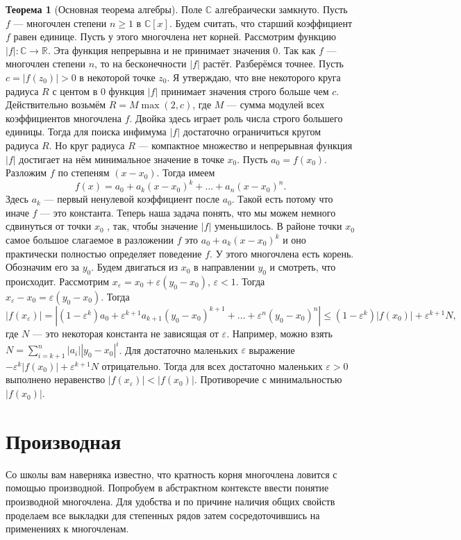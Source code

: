 \documentclass[10pt,a4paper,oneside]{book} %
\theoremstyle{definition}
\newtheorem*{thmm}{Теорема}
\newcommand{\mb}[1]{\mathbb{#1}}
\def\eps{\varepsilon}
\begin{document}
\begin{thmm}[Основная теорема алгебры] Поле $\mb C$ алгебраически замкнуто.
\proof Пусть $f$ — многочлен степени $n\geq 1$ в $\mb C[x]$. Будем считать, что старший коэффициент $f$ равен единице. Пусть у этого многочлена нет корней. Рассмотрим функцию $|f|\colon \mb C \to \mb R$. Эта функция непрерывна и не принимает значения 0. Так как $f$ --- многочлен степени $n$, то на бесконечности $|f|$ растёт. Разберёмся точнее. Пусть
$c = |f(z_0)| > 0$ в некоторой точке $z_0$. Я утверждаю, что вне некоторого круга радиуса $R$ с центом в 0 функция
$|f|$ принимает значения строго больше чем $c$. Действительно возьмём $R= M \max(2,c)$, где $M$ --- сумма модулей всех коэффициентов многочлена $f$. Двойка здесь играет роль числа строго большего единицы.
Тогда для поиска инфимума $|f|$ достаточно ограничиться кругом радиуса $R$. Но круг радиуса $R$ --- компактное множество и непрерывная функция $|f|$ достигает на нём минимальное значение в точке $x_0$. Пусть $a_0 =f(x_0)$. Разложим
$f$ по степеням $(x-x_0)$. Тогда имеем
$$f(x) = a_0 + a_k (x-x_0)^k + \dots + a_n(x -x_0 )^n.$$
Здесь $a_k$ --- первый ненулевой коэффициент после $a_0$. Такой есть потому что иначе $f$ --- это константа. Теперь наша
задача понять, что мы можем немного сдвинуться от точки $x_0$ , так, чтобы значение $|f|$ уменьшилось. В районе точки
$x_0$ самое большое слагаемое в разложении $f$ это $a_0 + a_k (x-x_0)^k$ и оно практически полностью определяет поведение $f$.
У этого многочлена есть корень. Обозначим его за $y_0$. Будем двигаться из $x_0$ в направлении $y_0$ и смотреть, что происходит.
Рассмотрим $x_{\eps} = x_0 + \eps(y_0 -x_0 ), \,\eps < 1$. Тогда $x_{\eps} -x_0 = \eps(y_0 -x_0 )$. Тогда
$$|f(x_{\eps})| = |(1 - \eps^k)a_0 + \eps^{k+1} a_{k+1} (y_0 -x_0)^{k+1} + \dots+ \eps^n(y_0-x_0 )^n | \leq (1- \eps^k )|f(x_0)| + \eps^{k+1}N,$$
где $N$ — это некоторая константа не зависящая от $\eps$. Например, можно взять $N = \sum_{i=k+1}^n |a_i||y_0 -x_0 |^i$. Для достаточно
маленьких $\eps$ выражение $ -\eps^k |f(x_0)| + \eps^{k+1}N$ отрицательно. Тогда для всех достаточно маленьких $\eps>0$ выполнено неравенство $|f(x_{\eps})| < |f(x_0)|$.
Противоречие с минимальностью $|f(x_0)|$. \endproof
\end{thmm}






\section{Производная}
Со школы вам наверняка известно, что кратность корня многочлена ловится с помощью производной. Попробуем в абстрактном
контексте ввести понятие производной многочлена. Для удобства и по причине наличия общих свойств проделаем все выкладки для степенных рядов затем сосредоточившись на применениях к многочленам.
\end{document}
